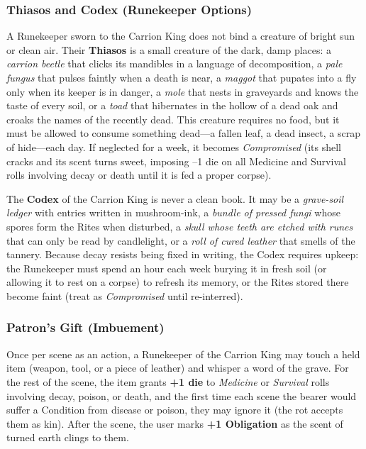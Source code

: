 \subsubsection*{Thiasos and Codex (Runekeeper Options)}

A Runekeeper sworn to the Carrion King does not bind a creature of bright sun or clean air. Their \textbf{Thiasos} is a small creature of the dark, damp places: a \textit{carrion beetle} that clicks its mandibles in a language of decomposition, a \textit{pale fungus} that pulses faintly when a death is near, a \textit{maggot} that pupates into a fly only when its keeper is in danger, a \textit{mole} that nests in graveyards and knows the taste of every soil, or a \textit{toad} that hibernates in the hollow of a dead oak and croaks the names of the recently dead. This creature requires no food, but it must be allowed to consume something dead---a fallen leaf, a dead insect, a scrap of hide---each day. If neglected for a week, it becomes \textit{Compromised} (its shell cracks and its scent turns sweet, imposing --1 die on all Medicine and Survival rolls involving decay or death until it is fed a proper corpse).

The \textbf{Codex} of the Carrion King is never a clean book. It may be a \textit{grave-soil ledger} with entries written in mushroom-ink, a \textit{bundle of pressed fungi} whose spores form the Rites when disturbed, a \textit{skull whose teeth are etched with runes} that can only be read by candlelight, or a \textit{roll of cured leather} that smells of the tannery. Because decay resists being fixed in writing, the Codex requires upkeep: the Runekeeper must spend an hour each week burying it in fresh soil (or allowing it to rest on a corpse) to refresh its memory, or the Rites stored there become faint (treat as \textit{Compromised} until re-interred).

\subsubsection*{Patron's Gift (Imbuement)}

Once per scene as an action, a Runekeeper of the Carrion King may touch a held item (weapon, tool, or a piece of leather) and whisper a word of the grave. For the rest of the scene, the item grants \textbf{+1 die} to \textit{Medicine} or \textit{Survival} rolls involving decay, poison, or death, and the first time each scene the bearer would suffer a Condition from disease or poison, they may ignore it (the rot accepts them as kin). After the scene, the user marks \textbf{+1 Obligation} as the scent of turned earth clings to them.

